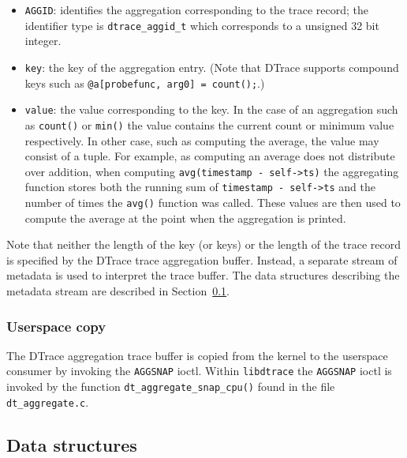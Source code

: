 \begin{itemize}

	\item{\texttt{AGGID}}: identifies the aggregation corresponding to the
trace record; the identifier type is \texttt{dtrace\_aggid\_t} which corresponds
to a unsigned 32 bit integer.

	\item{\texttt{key}:} the key of the aggregation entry. (Note that
DTrace supports compound keys such as \texttt{@a[probefunc, arg0] = count();}.)

	\item{\texttt{value}:} the value corresponding to the key. In the case of
an aggregation such as \texttt{count()} or \texttt{min()} the value contains
the current count or minimum value respectively. In other case, such as
computing the average, the value may consist of a tuple. For example, as
computing an average does not distribute over addition, when computing
\texttt{avg(timestamp - self->ts)} the aggregating function stores both the
running sum of \texttt{timestamp - self->ts} and the number of times the
\texttt{avg()} function was called. These values are then used to compute the
average at the point when the aggregation is printed.

\end{itemize}

Note that neither the length of the key (or keys) or the length of the trace
record is specified by the DTrace trace aggregation buffer.
Instead, a separate stream of metadata is used to interpret the trace buffer.
The data structures describing the metadata stream are described in
Section~\ref{subsec:agg_data_structures}.

\subsubsection{Userspace copy}
\label{subsubsec:bufsnap}

The DTrace aggregation trace buffer is copied from the kernel to the userspace
consumer by invoking the \texttt{AGGSNAP} ioctl.  Within \texttt{libdtrace} the
\texttt{AGGSNAP} ioctl is invoked by the function
\texttt{dt\_aggregate\_snap\_cpu()} found in the file \texttt{dt\_aggregate.c}.

\subsection{Data structures}
\label{subsec:agg_data_structures}

